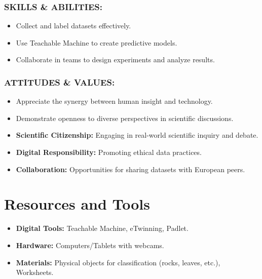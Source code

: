 \documentclass[11pt, a4paper]{article}
\begin{document}
\subsubsection*{SKILLS \& ABILITIES:}
\begin{itemize}
    \item Collect and label datasets effectively.
    \item Use Teachable Machine to create predictive models.
    \item Collaborate in teams to design experiments and analyze results.
\end{itemize}

\subsubsection*{ATTITUDES \& VALUES:}
\begin{itemize}
    \item Appreciate the synergy between human insight and technology.
    \item Demonstrate openness to diverse perspectives in scientific discussions.
\end{itemize}

\begin{eurobox}
\begin{itemize}
    \item \textbf{Scientific Citizenship:} Engaging in real-world scientific inquiry and debate.
    \item \textbf{Digital Responsibility:} Promoting ethical data practices.
    \item \textbf{Collaboration:} Opportunities for sharing datasets with European peers.
\end{itemize}
\end{eurobox}

\newpage
\section{Resources and Tools}
\begin{itemize}
    \item \textbf{Digital Tools:} Teachable Machine, eTwinning, Padlet.
    \item \textbf{Hardware:} Computers/Tablets with webcams.
    \item \textbf{Materials:} Physical objects for classification (rocks, leaves, etc.), Worksheets.
\end{itemize}
\end{document}
